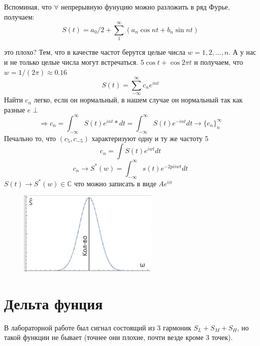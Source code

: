 \documentclass{article}
\begin{document}
\par Вспоминая, что $\forall$ непрерывную фунуцию можно разложить в ряд Фурье, получаем:
$$ S(t) = a_{0}/{2} + \sum_{1}^{\infty} (a_{n} \cos{n t} + b_n \sin{n t})$$
\par { это плохо?} \newline
Тем, что в качестве частот берутся целые числа $w = 1,2, ... , n$. А у нас и не только целые числа могут встречаться.  \newline
$5 \cos{t} + \cos{2 \pi t}$ и получаем, что $w = 1/(2 \pi) \approx 0.16$  \newline
$$S(t) = \sum_{- \infty}^{\infty} c_{n} e^{i n t}$$  \newline
Найти $c_{n}$ легко, если он нормальный, в нашем случае он нормальный так как разные $e \perp$  \newline
$$ \Rightarrow c_{n} = \int_{- \infty}^{\infty} S(t) e^{i n t} * dt = \int_{- \infty}^{\infty} S(t) e^{-i n t} dt \to \{c_n\}_n^\infty$$
Печально то, что $(c_{5},c_{-5})$ характеризуют одну и ту же частоту 5
$$c_{n} = \int S(t) e^{i w t} dt$$
$$c_{n} \to S^* (w) = \int_{-\infty}^{\infty} s(t) e^{-2 pi i w t} dt$$
$S(t) \to S^* (w) \in \mathbb {C}$ что можно записать в виде $A e^{i \phi}$
\begin{figure}[H]
 \centering
  \includegraphics[width=0.6\textwidth]{pig1.jpg}
  \label{Fig3}
\end{figure}

\section{\label{s2}Дельта фунция} \newline
\par 
\par В лабораторной работе был сигнал состоящий из 3 гармоник $S_{L} + S_{M} + S_{H}$, но такой функции не бывает (точнее они плохие, почти везде кроме 3 точек).\newline
\end{document}
